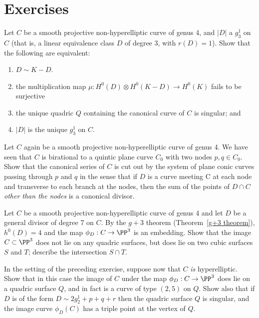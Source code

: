 \section{Exercises}

\begin{exercise} \label{ex7.1}
Let $C$ be a smooth projective non-hyperelliptic curve of genus 4, and $|D|$ a $g^1_3$ on $C$ (that is, a linear equivalence class $D$ of degree 3, with $r(D) = 1$). Show that the following are equivalent:
\begin{enumerate}
\item $D \sim K-D$. 
\item the multiplication map $\mu : H^0(D) \otimes H^0(K-D) \to H^0(K)$ fails to be surjective
\item the unique quadric $Q$ containing the canonical curve of $C$ is singular; and
\item $|D|$ is the unique $g^1_3$ on $C$.
\end{enumerate}
\end{exercise}

\begin{exercise}\label{ex7.2}
Let $C$ again be a smooth projective non-hyperelliptic curve of genus 4. We have seen that $C$ is birational to a quintic plane curve $C_0$ with two nodes $p, q \in C_0$. Show that the canonical series of $C$ is cut out by the system of plane conic curves passing through $p$ and $q$ in the sense
that if $D$ is a curve meeting C at each node and transverse to each branch at the nodes, then
the sum of the points of $D\cap C$ \emph{other than the nodes} is a canonical divisor.
\end{exercise}

\begin{exercise}\label{ex7.3}
Let $C$  be a smooth projective non-hyperelliptic curve of genus 4 and let $D$ be a general divisor of degree 7 on $C$. By the $g+3$ theorem (Theorem~\ref{g+3 theorem}), $h^0(D) = 4$ and the map $\phi_D : C \to \PP^3$ is an embedding. Show that the image $C \subset \PP^3$ does not lie on any quadric surfaces, but does lie on two cubic surfaces $S$ and $T$; describe the intersection $S \cap T$.
\end{exercise}

\begin{exercise}\label{ex7.4}
In the setting of the preceding exercise, suppose now that $C$ \emph{is} hyperelliptic. Show that in this case the image of $C$ under the map $\phi_D : C \to \PP^3$ does lie on a quadric surface $Q$, and in fact is a curve of type $(2,5)$ on $Q$. Show also that if $D$ is of the form $D \sim 2g^1_2 + p + q + r$ then the quadric surface $Q$ is singular, and the image curve $\phi_D(C)$ has a triple point at the vertex of $Q$.
 \end{exercise}

